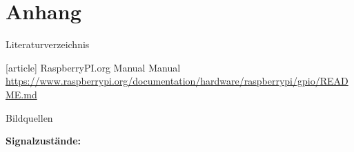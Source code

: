 \section{Anhang}
\begin{frame}{Literaturverzeichnis}
    \begin{thebibliography}{Längste Bezeichnung}
        [article]
           RaspberryPI.org Manual
            \newblock Manual \url{https://www.raspberrypi.org/documentation/hardware/raspberrypi/gpio/README.md}
    \end{thebibliography}
\end{frame}
{
    \tiny
    \begin{frame}{Bildquellen}
        \begin{minipage}{\textwidth}
            \textbf{Signalzustände:} \\
        \end{minipage}

        \smallskip

    \end{frame}
}
